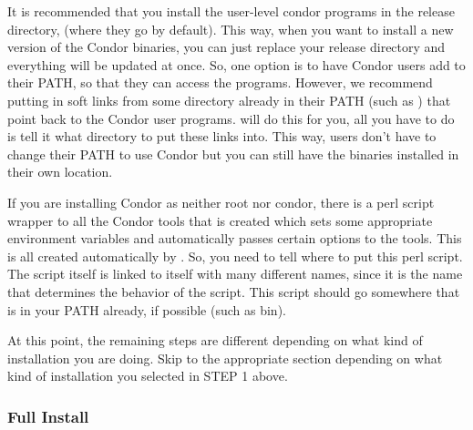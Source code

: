 \begin{description}
     It is recommended that you install the user-level condor programs
     in the release directory, (where they go by default).  This way,
     when you want to install a new version of the Condor binaries,
     you can just replace your release directory and everything will
     be updated at once.  So, one option is to have Condor users add
      to their PATH, so that they can access the
     programs.  However, we recommend putting in soft links from some
     directory already in their PATH (such as ) that
     point back to the Condor user programs.   will do
     this for you, all you have to do is tell it what directory to put
     these links into.  This way, users don't have to change their
     PATH to use Condor but you can still have the binaries installed
     in their own location.

     If you are installing Condor as neither root nor condor, there is
     a perl script wrapper to all the Condor tools that is created
     which sets some appropriate environment variables and
     automatically passes certain options to the tools.  This is all
     created automatically by .  So, you need to tell
      where to put this perl script.  The script itself
     is linked to itself with many different names, since it is the
     name that determines the behavior of the script.  This script
     should go somewhere that is in your PATH already, if possible
     (such as \Tilde bin).

\end{description}

At this point, the remaining steps are different depending on what
kind of installation you are doing.  Skip to the appropriate section
depending on what kind of installation you selected in STEP 1 above.

\subsubsection{Full Install}

